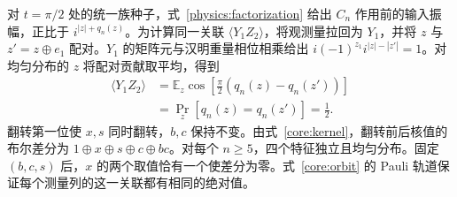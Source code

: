 对 $t=\pi/2$ 处的统一族种子，式~\eqref{physics:factorization} 给出 $C_n$ 作用前的输入振幅，正比于 $i^{|z|+q_n(z)}$。为计算同一关联 $\langle Y_1Z_2\rangle$，将观测量拉回为 $Y_1$，并将 $z$ 与 $z'=z\oplus e_1$ 配对。$Y_1$ 的矩阵元与汉明重量相位相乘给出 $i(-1)^{z_1}i^{|z|-|z'|}=1$。对均匀分布的 $z$ 将配对贡献取平均，得到
\begin{equation}
 \begin{aligned}
 \langle Y_1Z_2\rangle
 &=\mathbb E_z\cos\!\left[\tfrac{\pi}{2}(q_n(z)-q_n(z'))\right]\\
 &=\Pr_z[q_n(z)=q_n(z')]=\tfrac12.
 \end{aligned}
 \label{physics:endpoint-correlator}
\end{equation}
翻转第一位使 $x,s$ 同时翻转，$b,c$ 保持不变。由式~\eqref{core:kernel}，翻转前后核值的布尔差分为 $1\oplus x\oplus s\oplus c\oplus bc$。对每个 $n\ge5$，四个特征独立且均匀分布。固定 $(b,c,s)$ 后，$x$ 的两个取值恰有一个使差分为零。式~\eqref{core:orbit} 的 Pauli 轨道保证每个测量列的这一关联都有相同的绝对值。

